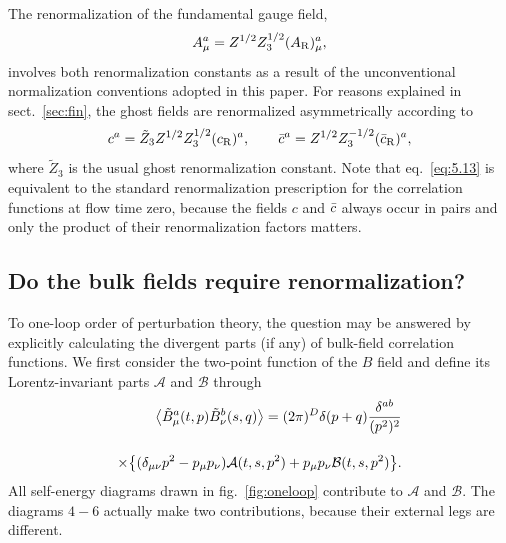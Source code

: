 The renormalization of the fundamental gauge field,
\begin{equation}
   A_{\mu}^a=Z^{1/2}Z_3^{1/2}(A_{\mathrm{R}})^a_{\mu},
   \label{eq:5.12}
\end{equation}
involves both renormalization constants
as a result of the unconventional normalization conventions
adopted in this paper. For reasons explained in sect.~\ref{sec:fin},
the ghost fields are renormalized asymmetrically according to
\begin{equation}
   c^a=\tilde{Z}_3Z^{1/2}Z_3^{1/2}(c_{\mathrm{R}})^a,
   \qquad
   \bar{c}^a=Z^{1/2}Z_3^{-1/2}(\bar{c}_{\mathrm{R}})^a,
   \label{eq:5.13}
\end{equation}
where $\tilde{Z}_3$ is the usual ghost renormalization constant.
Note that eq.~\eqref{eq:5.13} is equivalent
to the standard renormalization prescription for the
correlation functions at flow time zero, because the fields
$c$ and $\bar{c}$ always occur in pairs and only the
product of their renormalization factors matters.

\subsection{Do the bulk fields require renormalization?}

To one-loop order of perturbation
theory, the question may be answered by explicitly calculating
the divergent parts (if any) of bulk-field correlation functions.
We first consider the
two-point function of the $B$ field and
define its Lorentz-invariant parts $\mathcal{A}$ and $\mathcal{B}$
through
\begin{align}
   \bigl\langle\tilde{B}_{\mu}^a(t,p)\tilde{B}_{\nu}^b(s,q)\bigr\rangle
   =(2\pi)^D\delta(p+q){\delta^{ab}\over(p^2)^2}
   \notag\\[2.5ex]
   \times
   \bigl\{(\delta_{\mu\nu}p^2-p_{\mu}p_{\nu})\mathcal{A}(t,s,p^2)
   +p_{\mu}p_{\nu}\mathcal{B}(t,s,p^2)\bigr\}.
   \label{eq:5.14}
\end{align}
All self-energy diagrams drawn in fig.~\ref{fig:oneloop} contribute to
$\mathcal{A}$ and $\mathcal{B}$.
The diagrams $4-6$ actually make
two contributions, because their external legs are different.


